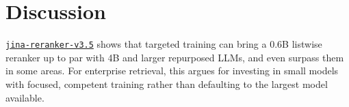 \documentclass{article}
\newcommand{\jrrvthreefive}{\href{https://huggingface.co/jinaai/jina-reranker-v3.5}{\texttt{jina-reranker-v3.5}}}
\begin{document}



\section{Discussion}
\label{sec:discussion}

\jrrvthreefive{} shows that targeted training can bring a $0.6$B listwise reranker up to par with 4B and larger repurposed LLMs, and even surpass them in some areas. For enterprise retrieval, this argues for investing in small models with focused, competent training rather than defaulting to the largest model available.

\end{document}
